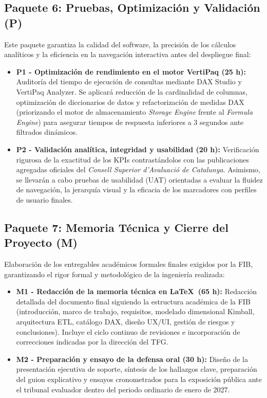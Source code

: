 \documentclass[12pt, a4paper, twoside]{report}
\begin{document}
\subsection{Paquete 6: Pruebas, Optimización y Validación (P)}
Este paquete garantiza la calidad del software, la precisión de los cálculos analíticos y la eficiencia en la navegación interactiva antes del despliegue final:
\begin{itemize}[itemsep=5pt, topsep=4pt]
    \item \textbf{P1 - Optimización de rendimiento en el motor VertiPaq (25 h):} Auditoría del tiempo de ejecución de consultas mediante DAX Studio y VertiPaq Analyzer. Se aplicará reducción de la cardinalidad de columnas, optimización de diccionarios de datos y refactorización de medidas DAX (priorizando el motor de almacenamiento \textit{Storage Engine} frente al \textit{Formula Engine}) para asegurar tiempos de respuesta inferiores a 3 segundos ante filtrados dinámicos.
    \item \textbf{P2 - Validación analítica, integridad y usabilidad (20 h):} Verificación rigurosa de la exactitud de los KPIs contrastándolos con las publicaciones agregadas oficiales del \textit{Consell Superior d'Avaluació de Catalunya}. Asimismo, se llevarán a cabo pruebas de usabilidad (UAT) orientadas a evaluar la fluidez de navegación, la jerarquía visual y la eficacia de los marcadores con perfiles de usuario finales.
\end{itemize}

\subsection{Paquete 7: Memoria Técnica y Cierre del Proyecto (M)}
Elaboración de los entregables académicos formales finales exigidos por la FIB, garantizando el rigor formal y metodológico de la ingeniería realizada:
\begin{itemize}[itemsep=5pt, topsep=4pt]
    \item \textbf{M1 - Redacción de la memoria técnica en \LaTeX\ (65 h):} Redacción detallada del documento final siguiendo la estructura académica de la FIB (introducción, marco de trabajo, requisitos, modelado dimensional Kimball, arquitectura ETL, catálogo DAX, diseño UX/UI, gestión de riesgos y conclusiones). Incluye el ciclo continuo de revisiones e incorporación de correcciones indicadas por la dirección del TFG.
    \item \textbf{M2 - Preparación y ensayo de la defensa oral (30 h):} Diseño de la presentación ejecutiva de soporte, síntesis de los hallazgos clave, preparación del guion explicativo y ensayos cronometrados para la exposición pública ante el tribunal evaluador dentro del periodo ordinario de enero de 2027.
\end{itemize}
\end{document}
